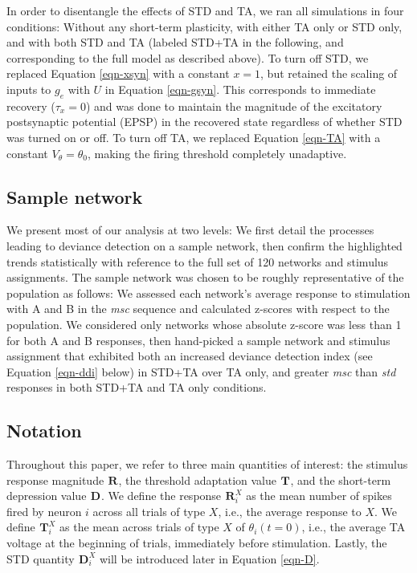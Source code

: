 \documentclass[pdflatex,referee,iicol,sn-basic]{sn-jnl}
\newcommand{\msc}{\textit{msc}}
\newcommand{\std}{\textit{std}}
\renewcommand{\R}[3][]{{}^{#1}_{}\!\mathbf{R}^{#2}_{#3}}
\renewcommand{\T}[3][]{{}^{#1}_{}\mathbf{T}^{#2}_{#3}}
\newcommand{\D}[3][]{{}^{#1}_{}\!\mathbf{D}^{#2}_{#3}}
\theoremstyle{thmstyleone}%
\theoremstyle{thmstyletwo}%
\theoremstyle{thmstylethree}%
\begin{document}
In order to disentangle the effects of STD and TA, we ran all simulations in four conditions: Without any short-term plasticity, with either TA only or STD only, and with both STD and TA (labeled STD+TA in the following, and corresponding to the full model as described above). To turn off STD, we replaced Equation \ref{eqn-xsyn} with a constant $x = 1$, but retained the scaling of inputs to $g_e$ with $U$ in Equation \ref{eqn-gsyn}. This corresponds to immediate recovery ($\tau_x = 0$) and was done to maintain the magnitude of the excitatory postsynaptic potential (EPSP) in the recovered state regardless of whether STD was turned on or off. To turn off TA, we replaced Equation \ref{eqn-TA} with a constant $V_{\theta} = \theta_0$, making the firing threshold completely unadaptive.

\subsection{Sample network}\label{sec-sample}

We present most of our analysis at two levels: We first detail the processes leading to deviance detection on a sample network, then confirm the highlighted trends statistically with reference to the full set of 120 networks and stimulus assignments. The sample network was chosen to be roughly representative of the population as follows: We assessed each network's average response to stimulation with A and B in the \msc{} sequence and calculated z-scores with respect to the population. We considered only networks whose absolute z-score was less than 1 for both A and B responses, then hand-picked a sample network and stimulus assignment that exhibited both an increased deviance detection index (see Equation \ref{eqn-ddi} below) in STD+TA over TA only, and greater \msc{} than \std{} responses in both STD+TA and TA only conditions.

\subsection{Notation}\label{sec-notation}

Throughout this paper, we refer to three main quantities of interest: the stimulus response magnitude $\R{}{}$, the threshold adaptation value $\T{}{}$, and the short-term depression value $\D{}{}$. We define the response $\R{X}{i}$ as the mean number of spikes fired by neuron $i$ across all trials of type $X$, i.e., the average response to $X$. We define $\T{X}{i}$ as the mean across trials of type $X$ of $\theta_i(t=0)$, i.e., the average TA voltage at the beginning of trials, immediately before stimulation. Lastly, the STD quantity $\D{X}{i}$ will be introduced later in Equation \ref{eqn-D}.
\end{document}
